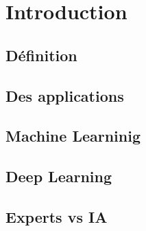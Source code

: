 \section{Introduction}
\subsection{Définition}
\subsection{Des applications}
\subsection{Machine Learninig}
\subsection{Deep Learning}
\subsection{Experts  vs IA}

